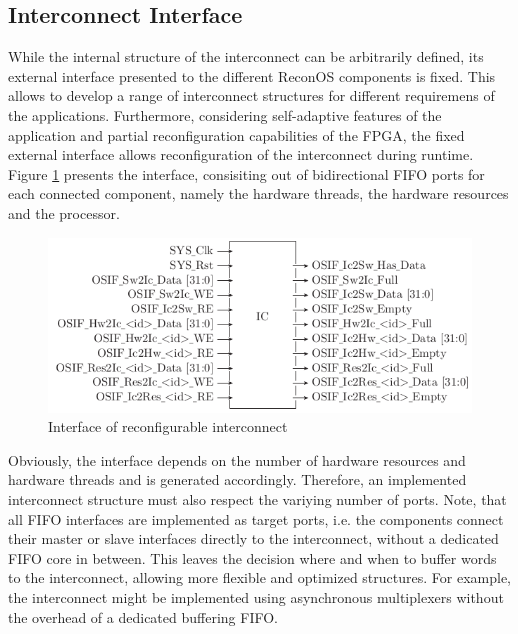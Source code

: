 \subsection{Interconnect Interface}
While the internal structure of the interconnect can be arbitrarily defined,
its external interface presented to the different ReconOS components is fixed.
This allows to develop a range of interconnect structures for different
requiremens of the applications. Furthermore, considering self-adaptive
features of the application and partial reconfiguration capabilities of the
\ac{FPGA}, the fixed external interface allows reconfiguration of the
interconnect during runtime. Figure \ref{fig:interconnect_if} presents the
interface, consisiting out of bidirectional \ac{FIFO} ports for each connected
component, namely the hardware threads, the hardware resources and the
processor.
\begin{figure}[tb]
	\centering
	\includegraphics[width=12cm]{../figures/interconnect_if}
	\caption{Interface of reconfigurable interconnect}
	\label{fig:interconnect_if}
\end{figure}
Obviously, the interface depends on the number of hardware resources and
hardware threads and is generated accordingly. Therefore, an implemented
interconnect structure must also respect the variying number of ports. Note,
that all \ac{FIFO} interfaces are implemented as target ports, i.e. the
components connect their master or slave interfaces directly to the
interconnect, without a dedicated \ac{FIFO} core in between. This leaves the
decision where and when to buffer words to the interconnect, allowing more
flexible and optimized structures. For example, the interconnect might be
implemented using asynchronous multiplexers without the overhead of a
dedicated buffering \ac{FIFO}.

